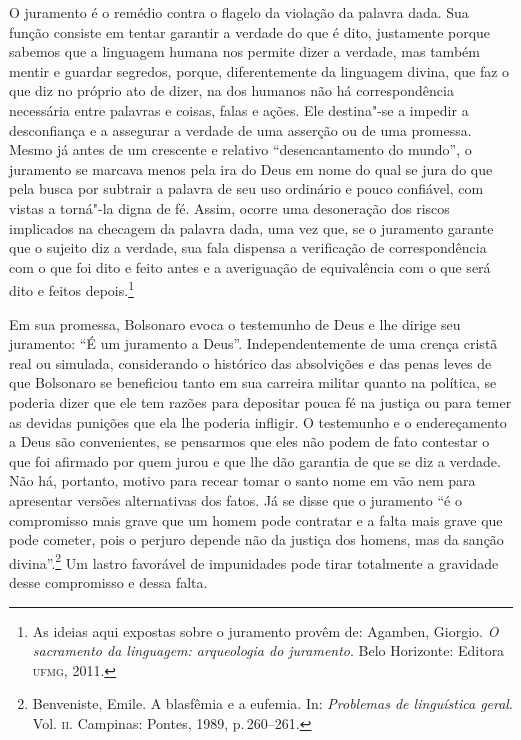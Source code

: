 O juramento é o remédio contra o flagelo da violação da palavra dada.
Sua função consiste em tentar garantir a verdade do que é dito,
justamente porque sabemos que a linguagem humana nos permite dizer a
verdade, mas também mentir e guardar segredos, porque, diferentemente da
linguagem divina, que faz o que diz no próprio ato de dizer, na dos
humanos não há correspondência necessária entre palavras e coisas, falas
e ações. Ele destina"-se a impedir a desconfiança e a assegurar a verdade
de uma asserção ou de uma promessa. Mesmo já antes de um crescente e
relativo ``desencantamento do mundo'', o juramento se marcava menos pela
ira do Deus em nome do qual se jura do que pela busca por subtrair a
palavra de seu uso ordinário e pouco confiável, com vistas a torná"-la
digna de fé. Assim, ocorre uma desoneração dos riscos implicados na
checagem da palavra dada, uma vez que, se o juramento garante que o
sujeito diz a verdade, sua fala dispensa a verificação de
correspondência com o que foi dito e feito antes e a averiguação de
equivalência com o que será dito e feitos depois.\footnote{As ideias aqui
  expostas sobre o juramento provêm de: Agamben, Giorgio. \emph{O
  sacramento da linguagem: arqueologia do juramento}. Belo Horizonte:
  Editora \textsc{ufmg}, 2011.}

Em sua promessa, Bolsonaro evoca o testemunho de Deus e lhe dirige seu
juramento: ``É um juramento a Deus''. Independentemente de uma crença
cristã real ou simulada, considerando o histórico das absolvições e das
penas leves de que Bolsonaro se beneficiou tanto em sua carreira militar
quanto na política, se poderia dizer que ele tem razões para depositar
pouca fé na justiça ou para temer as devidas punições que ela lhe
poderia infligir. O testemunho e o endereçamento a Deus são
convenientes, se pensarmos que eles não podem de fato contestar o que
foi afirmado por quem jurou e que lhe dão garantia de que se diz a
verdade. Não há, portanto, motivo para recear tomar o santo nome em vão
nem para apresentar versões alternativas dos fatos. Já se disse que o
juramento ``é o compromisso mais grave que um homem pode contratar e a
falta mais grave que pode cometer, pois o perjuro depende não da justiça
dos homens, mas da sanção divina''.\footnote{Benveniste, Emile. A
  blasfêmia e a eufemia. In: \emph{Problemas de linguística geral}. Vol.
  \textsc{ii}. Campinas: Pontes, 1989, p.\,260--261.} Um lastro favorável de
impunidades pode tirar totalmente a gravidade desse compromisso e dessa
falta.

